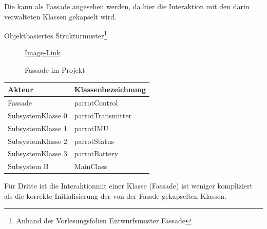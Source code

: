 Die  kann als Fassade angesehen werden, da hier die Interaktion mit den darin verwalteten Klassen gekapselt wird.


Objektbasiertes Strukturmuster\footnote{Anhand der Vorlesungsfolien \glq Entwurfsmuster Fassade\grq}


\begin{figure}[ht!]
\vspace{0.25cm}
\begin{center}
\caption{Fassade im Projekt}
\label{fig:Fas}
\end{center}

\vspace{0.25cm}
\href{https://github.com/MaagMich/SWE2\_Project/blob/c5c3674bd201ee306463881cf711bb2ce9229842/Ausarbeitung/Pictures/Fassade.png}{Image-Link}
\end{figure}

\begin{table}[!ht]
\begin{tabular}{ll}
Akteur			& Klassenbezeichnung \\ \hline
Fassade			& parrotControl\\
SubsystemKlasse 0	& parrotTransmitter\\
SubsystemKlasse 1	& parrotIMU\\
SubsystemKlasse 2	& parrotStatus\\
SubsystemKlasse 3	& parrotBattery\\
Subsystem B		& MainClass
\end{tabular}
\end{table}


\FloatBarrier
{}
Für Dritte ist die Interaktionmit einer Klasse (Fassade) ist weniger kompliziert als die korrekte Initialisierung der von der Fassde gekapselten Klassen.
